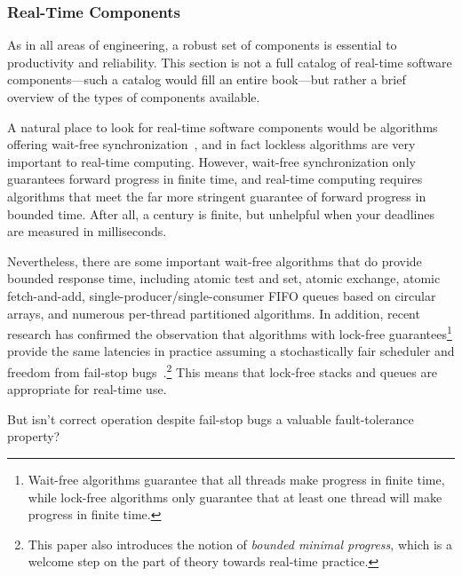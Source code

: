 \subsubsection{Real-Time Components}
\label{sec:advsync:Real-Time Components}

As in all areas of engineering, a robust set of components is essential
to productivity and reliability.
This section is not a full catalog of real-time software components---such
a catalog would fill an entire book---but rather a brief overview of the
types of components available.

A natural place to look for real-time software components would be
algorithms offering wait-free
synchronization~\cite{Herlihy91}, and in fact lockless
algorithms are very important to real-time computing.
However, wait-free synchronization only guarantees forward progress in
finite time, and real-time computing requires algorithms that meet the
far more stringent guarantee of forward progress in bounded time.
After all, a century is finite, but unhelpful when your deadlines are
measured in milliseconds.

Nevertheless, there are some important wait-free algorithms that do
provide bounded response time, including atomic test and set,
atomic exchange,
atomic fetch-and-add,
single-producer/single-consumer FIFO queues based on circular arrays,
and numerous per-thread partitioned algorithms.
In addition, recent research has confirmed the observation that
algorithms with lock-free guarantees\footnote{
	Wait-free algorithms guarantee that all threads make progress in
	finite time, while lock-free algorithms only guarantee that at
	least one thread will make progress in finite time.}
provide the same latencies in practice assuming a stochastically
fair scheduler and freedom from fail-stop
bugs~\cite{DanAlitarh2013PracticalProgress}.\footnote{
	This paper also introduces the notion of \emph{bounded minimal
	progress}, which is a welcome step on the part of theory
	towards real-time practice.}
This means that lock-free stacks and queues are appropriate
for real-time use.

\QuickQuiz{}
	But isn't correct operation despite fail-stop bugs
	a valuable fault-tolerance property?
 \QuickQuizEnd

